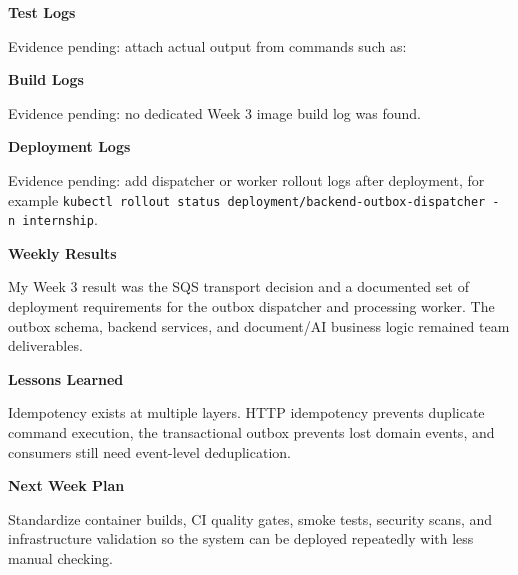 \vspace{0.5em}\noindent\textbf{Test Logs}\par

Evidence pending: attach actual output from commands such as:

\begin{Shaded}
\begin{Highlighting}[]
 
 
\end{Highlighting}
\end{Shaded}

\vspace{0.5em}\noindent\textbf{Build Logs}\par

Evidence pending: no dedicated Week 3 image build log was found.

\vspace{0.5em}\noindent\textbf{Deployment Logs}\par

Evidence pending: add dispatcher or worker rollout logs after
deployment, for example
\texttt{kubectl\ rollout\ status\ deployment/\allowbreak{}backend-\allowbreak{}outbox-\allowbreak{}dispatcher\ -n\ internship}.

\vspace{0.5em}\noindent\textbf{Weekly Results}\par

My Week 3 result was the SQS transport decision and a documented set of
deployment requirements for the outbox dispatcher and processing worker.
The outbox schema, backend services, and document/AI business logic
remained team deliverables.

\vspace{0.5em}\noindent\textbf{Lessons Learned}\par

Idempotency exists at multiple layers. HTTP idempotency prevents
duplicate command execution, the transactional outbox prevents lost
domain events, and consumers still need event-level deduplication.

\vspace{0.5em}\noindent\textbf{Next Week Plan}\par

Standardize container builds, CI quality gates, smoke tests, security
scans, and infrastructure validation so the system can be deployed
repeatedly with less manual checking.
